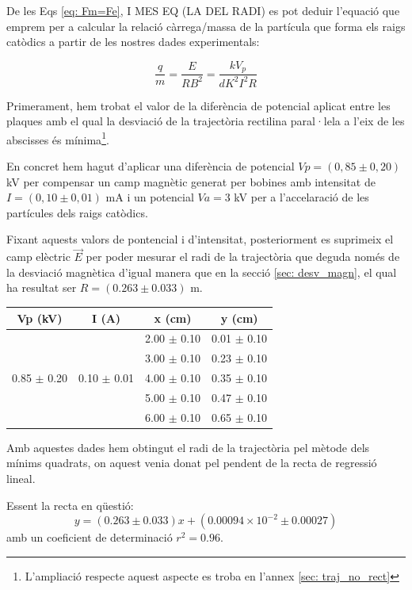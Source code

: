\documentclass[11pt]{article}
\begin{document}
De les Eqs \eqref{eq: Fm=Fe}, I MES EQ (LA DEL RADI) es pot deduir l'equació que emprem per a calcular la relació càrrega/massa de la partícula que forma els raigs catòdics a partir de les nostres dades experimentals:

\begin{equation}
    \frac{q}{m}=\frac{E}{RB^2}=\frac{kV_p}{dK^2I^2R}
\end{equation}

Primerament, hem trobat el valor de la diferència de potencial aplicat entre les plaques amb el qual la desviació de la trajectòria rectilina paral·lela a l'eix de les abscisses és mínima\footnote{L'ampliació respecte aquest aspecte es troba en l'annex \ref{sec: traj_no_rect}}. 

En concret hem hagut d'aplicar una diferència de potencial $Vp = (0,85 \pm 0,20 )$ kV per compensar un camp magnètic generat per bobines amb intensitat de $I = (0,10 \pm 0,01 )$ mA i un potencial $Va = 3$ kV per a l'accelaració de les partícules dels raigs catòdics.

Fixant aquests valors de pontencial i d'intensitat, posteriorment es suprimeix el camp elèctric $\vec{E}$ per poder mesurar el radi de la trajectòria que deguda només de la desviació magnètica d'igual manera que en la secció \ref{sec: desv_magn}, el qual ha resultat ser $R = (0.263 \pm 0.033)$ m.

\begin{table}[h!]
\centering
\begin{tabular}{|c|c|c|c|}
\hline
\textbf{Vp (kV)} & \textbf{I (A)} & \textbf{x (cm)} & \textbf{y (cm)} \\
\hline
 &  & 2.00 $\pm$ 0.10 & 0.01 $\pm$ 0.10 \\
 &  & 3.00 $\pm$ 0.10 & 0.23 $\pm$ 0.10 \\
0.85 $\pm$ 0.20 & 0.10 $\pm$ 0.01 & 4.00 $\pm$ 0.10 & 0.35 $\pm$ 0.10 \\
 &  & 5.00 $\pm$ 0.10 & 0.47 $\pm$ 0.10 \\
 &  & 6.00 $\pm$ 0.10 & 0.65 $\pm$ 0.10 \\
\hline
\end{tabular}
\end{table}

Amb aquestes dades hem obtingut el radi de la trajectòria pel mètode dels mínims quadrats, on aquest venia donat pel pendent de la recta de regressió lineal.

Essent la recta en qüestió: 
\begin{equation}
    y=(0.263 \pm 0.033)x + (0.00094\times10^{-2} \pm 0.00027)
\end{equation}  
amb un coeficient de determinació $r^2=0.96$.
\end{document}
